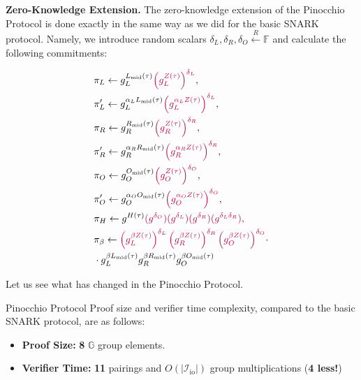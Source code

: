 \documentclass[../lecture-notes.tex]{subfiles}
\begin{document}
\vspace{-1mm}

\textcolor{blue!75!gray}{\textbf{Zero-Knowledge Extension.}} The zero-knowledge extension of the Pinocchio Protocol is done exactly in the same way as we did for the basic SNARK protocol. Namely, we introduce random scalars $\delta_L, \delta_R, \delta_O \xleftarrow{R} \mathbb{F}$ and calculate the following commitments:

\vspace{-7mm}

\begin{center}    
    \begin{equation*}
        \begin{aligned}    
            &\pi_L \gets g_L^{L_{\text{mid}}(\tau)}\textcolor{purple}{\left(g_L^{Z(\tau)}\right)^{\delta_L}}, \\ 
            &\pi_L' \gets g_L^{\alpha_LL_{\text{mid}}(\tau)}\textcolor{purple}{\left(g_L^{\alpha_L Z(\tau)}\right)^{\delta_L}}, \\
            &\pi_R \gets g_R^{R_{\text{mid}}(\tau)}\textcolor{purple}{\left(g_R^{Z(\tau)}\right)^{\delta_R}}, \\ 
            &\pi_R' \gets g_R^{\alpha_RR_{\text{mid}}(\tau)}\textcolor{purple}{\left(g_R^{\alpha_R Z(\tau)}\right)^{\delta_R}}, \\
            &\pi_O \gets g_O^{O_{\text{mid}}(\tau)}\textcolor{purple}{\left(g_O^{Z(\tau)}\right)^{\delta_O}}, \\
            &\pi_O' \gets g_O^{\alpha_OO_{\text{mid}}(\tau)}\textcolor{purple}{\left(g_O^{\alpha_O Z(\tau)}\right)^{\delta_O}}, \\
            &\pi_H \gets g^{H(\tau)}\textcolor{purple}{(g^{\delta_O})(g^{\delta_L})(g^{\delta_R})(g^{\delta_L\delta_R})}, \\ 
            &\pi_{\beta} \gets \textcolor{purple}{\left(g_L^{\beta Z(\tau)}\right)^{\delta_L}\left(g_R^{\beta Z(\tau)}\right)^{\delta_R}\left(g_O^{\beta Z(\tau)}\right)^{\delta_O}} \cdot \\ &  \cdot g_L^{\beta L_{\text{mid}}(\tau)}g_R^{\beta R_{\text{mid}}(\tau)}g_O^{\beta O_{\text{mid}}(\tau)}
        \end{aligned}
    \end{equation*}
\end{center}

Let us see what has changed in the Pinocchio Protocol.

\begin{proposition}{Pinocchio Protocol}
    Proof size and verifier time complexity, compared to the basic SNARK protocol, are as follows:
    \begin{itemize}
        \item \textbf{Proof Size:} \textbf{8} $\mathbb{G}$ group elements.
        \item \textbf{Verifier Time:} \textbf{11} pairings and $O(|\mathcal{I}_{\text{io}}|)$ group multiplications (\textbf{4 less!})
    \end{itemize}
\end{proposition}
\end{document}
